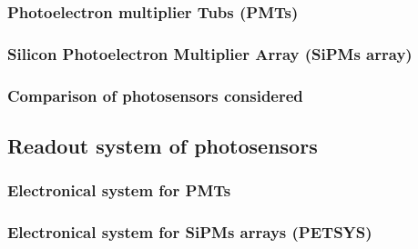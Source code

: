 \documentclass[12pt,a4paper]{book}
\begin{document}
			\subsubsection{Photoelectron multiplier Tubs (PMTs)}%
			\label{subsubsec:PMTs}
		
			\subsubsection{Silicon Photoelectron Multiplier Array (SiPMs array)}%
			\label{subsubsec:SiPM}
			
			\subsubsection[Comparison photosensors]{Comparison of photosensors considered}%
			\label{subsubsec:ComparisonPhotosensors}
			\newpage
					
		\subsection{Readout system of photosensors}\label{subsec:Electronic}
			\label{subsec:IntroductionElectronicalSystem}
	
			\subsubsection[Electronical system for PMTs]{Electronical system for PMTs}
			\label{subsubsec:PMTsElectronicalSystem}
	
			\subsubsection[PETSYS (SiPMs)]{Electronical system for SiPMs arrays (PETSYS) }
			\label{subsubsec:PETSYS}
			\newpage		
		
\end{document}
